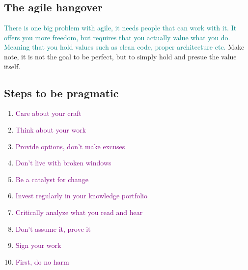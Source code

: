 \documentclass[main.tex,fontsize=8pt,paper=a4,paper=portrait,DIV=calc,]{scrartcl}
\begin{document}
\subsection{The agile hangover}
\textcolor{teal}{There is one big problem with agile, it needs people that can work with it.\newline
It offers you more freedom, but requires that you actually value what you do. Meaning that you hold values such as clean code, proper architecture etc.}
Make note, it is not the goal to be perfect, but to simply hold and presue the value itself.

\subsection{Steps to be pragmatic}
\begin{enumerate}
\item \textcolor{purple}{Care about your craft}
\item \textcolor{purple}{Think about your work}
\item \textcolor{purple}{Provide options, don't make excuses}
\item \textcolor{purple}{Don't live with broken windows}
\item \textcolor{purple}{Be a catalyst for change}
\item \textcolor{purple}{Invest regularly in your knowledge portfolio}
\item \textcolor{purple}{Critically analyze what you read and hear}
\item \textcolor{purple}{Don't assume it, prove it}
\item \textcolor{purple}{Sign your work}
\item \textcolor{purple}{First, do no harm}

\end{enumerate} 
\end{document}
